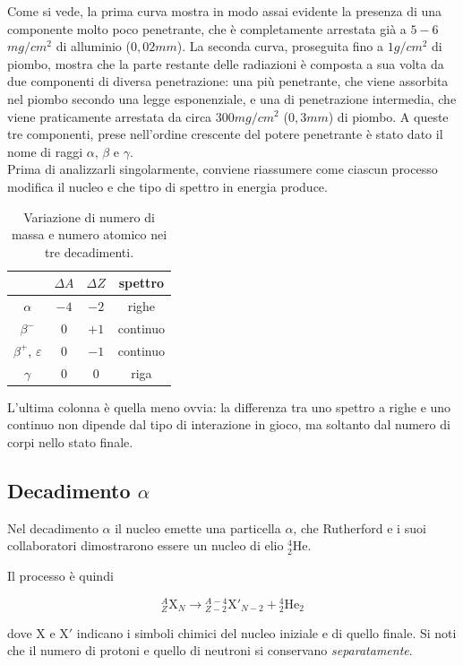 Come si vede, la prima curva mostra in modo assai evidente la presenza di una componente molto poco penetrante, che è completamente arrestata già a $5 - 6$ $mg/cm^2$ di alluminio ($0,02 mm$).
La seconda curva, proseguita fino a $1 g/cm^2$ di piombo, mostra che la parte restante delle radiazioni è composta a sua volta da due componenti di diversa penetrazione: una più penetrante, che viene assorbita nel piombo secondo una legge esponenziale, e una di penetrazione intermedia, che viene praticamente arrestata da circa $300 mg/cm^2$ ($0,3 mm$) di piombo.
A queste tre componenti, prese nell’ordine crescente del potere penetrante è stato dato il nome di raggi $\alpha$, $\beta$ e $\gamma$.\\

Prima di analizzarli singolarmente, conviene riassumere come ciascun processo modifica il nucleo e che tipo di spettro in energia produce. 

\begin{table}[htbp]
\centering
\begin{tabular}{cccc}
\hline
 & $\Delta A$ & $\Delta Z$ & spettro \\
\hline
$\alpha$ & $-4$ & $-2$ & righe \\
$\beta^-$ & $0$ & $+1$ & continuo \\
$\beta^+$, $\varepsilon$ & $0$ & $-1$ & continuo \\
$\gamma$ & $0$ & $0$ & riga \\
\hline
\end{tabular}
\caption{Variazione di numero di massa e numero atomico nei tre decadimenti.}
\label{tab:tipi_decadimento}
\end{table}

L'ultima colonna è quella meno ovvia: la differenza tra uno spettro a righe e uno continuo non dipende dal tipo di interazione in gioco, ma soltanto dal numero di corpi nello stato finale.

\subsection{Decadimento $\alpha$}

Nel decadimento $\alpha$ il nucleo emette una particella $\alpha$, che Rutherford e i suoi collaboratori dimostrarono essere un nucleo di elio ${}^{4}_{2}\mathrm{He}$. 

Il processo è quindi 
%
\begin{tcolorbox}[colback=black!5!white, colframe=black!45!white, boxrule=0.8pt]
\begin{equation}
    {}^{A}_{Z}\mathrm{X}_N \longrightarrow {}^{A-4}_{Z-2}\mathrm{X}'_{N-2} + {}^{4}_{2}\mathrm{He}_2
\end{equation}
\end{tcolorbox}
dove $\mathrm{X}$ e $\mathrm{X}'$ indicano i simboli chimici del nucleo iniziale e di quello finale. Si noti che il numero di protoni e quello di neutroni si conservano \emph{separatamente}. 

